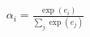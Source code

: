 \documentclass[preview]{standalone}
\begin{document}
\begin{align*}
\alpha_{i} = \frac{\exp(e_i)}{\sum_j \exp(e_j)}
\end{align*}
\end{document}
